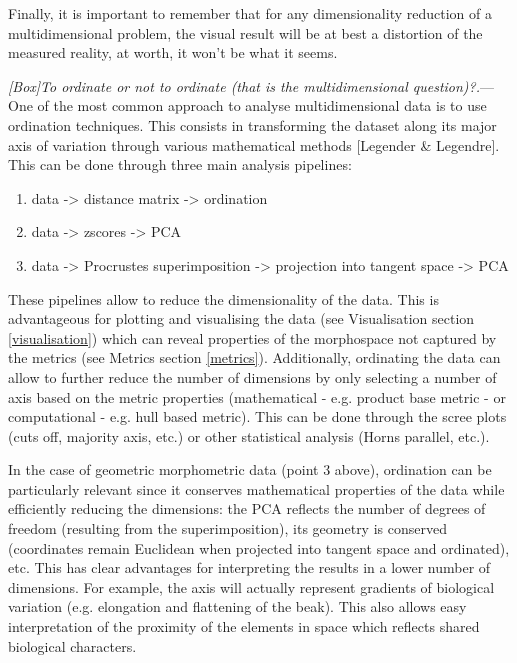 \documentclass[12pt,letterpaper]{article}
\renewcommand{\subsubsection}[1]{%
\vspace{2ex}
\noindent
\textit{#1.}---}
\begin{document}
Finally, it is important to remember that for any dimensionality reduction of a multidimensional problem, the visual result will be at best a distortion of the measured reality, at worth, it won't be what it seems.


\subsubsection{[Box]To ordinate or not to ordinate (that is the multidimensional question)?}
\label{box_ordination}
One of the most common approach to analyse multidimensional data is to use ordination techniques.
This consists in transforming the dataset along its major axis of variation through various mathematical methods [Legender \& Legendre].
This can be done through three main analysis pipelines:
\begin{enumerate}
    \item data -> distance matrix -> ordination
    \item data -> zscores -> PCA
    \item data -> Procrustes superimposition -> projection into tangent space -> PCA
\end{enumerate}

These pipelines allow to reduce the dimensionality of the data.
This is advantageous for plotting and visualising the data (see Visualisation section \ref{visualisation}) which can reveal properties of the morphospace not captured by the metrics (see Metrics section \ref{metrics}).
Additionally, ordinating the data can allow to further reduce the number of dimensions by only selecting a number of axis based on the metric properties (mathematical - e.g. product base metric - or computational - e.g. hull based metric).
This can be done through the scree plots (cuts off, majority axis, etc.) or other statistical analysis (Horns parallel, etc.).

In the case of geometric morphometric data (point 3 above), ordination can be particularly relevant since it conserves mathematical properties of the data while efficiently reducing the dimensions: the PCA reflects the number of degrees of freedom (resulting from the superimposition), its geometry is conserved (coordinates remain Euclidean when projected into tangent space and ordinated), etc.
This has clear advantages for interpreting the results in a lower number of dimensions.
For example, the axis will actually represent gradients of biological variation (e.g. elongation and flattening of the beak).
This also allows easy interpretation of the proximity of the elements in space which reflects shared biological characters.
\end{document}
